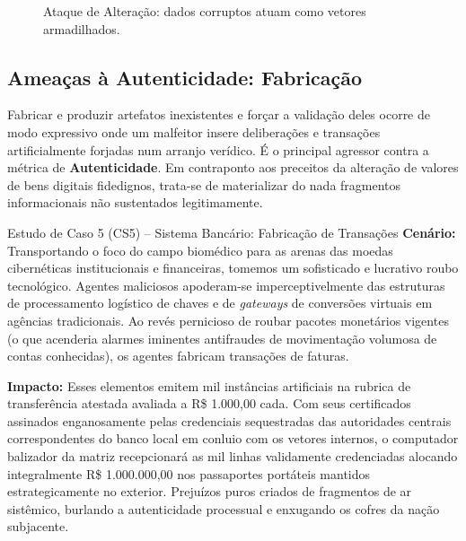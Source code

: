 \documentclass[12pt,a4paper,twoside]{report}
\begin{document}
\begin{figure}[h]
    \centering
    \caption{Ataque de Alteração: dados corruptos atuam como vetores armadilhados.}
    \label{fig:alteracao_registros}
\end{figure}

\subsection{Ameaças à Autenticidade: Fabricação}
Fabricar e produzir artefatos inexistentes e forçar a validação deles ocorre de modo expressivo onde um malfeitor insere deliberações e transações artificialmente forjadas num arranjo verídico. É o principal agressor contra a métrica de \textbf{Autenticidade}. Em contraponto aos preceitos da alteração de valores de bens digitais fidedignos, trata-se de materializar do nada fragmentos informacionais não sustentados legitimamente. 

\begin{block}{Estudo de Caso 5 (CS5) – Sistema Bancário: Fabricação de Transações}
\textbf{Cenário:} Transportando o foco do campo biomédico para as arenas das moedas cibernéticas institucionais e financeiras, tomemos um sofisticado e lucrativo roubo tecnológico. Agentes maliciosos apoderam-se imperceptivelmente das estruturas de processamento logístico de chaves e de \textit{gateways} de conversões virtuais em agências tradicionais. Ao revés pernicioso de roubar pacotes monetários vigentes (o que acenderia alarmes iminentes antifraudes de movimentação volumosa de contas conhecidas), os agentes fabricam transações de faturas.

\textbf{Impacto:} Esses elementos emitem mil instâncias artificiais na rubrica de transferência atestada avaliada a R\$ 1.000,00 cada. Com seus certificados assinados enganosamente pelas credenciais sequestradas das autoridades centrais correspondentes do banco local em conluio com os vetores internos, o computador balizador da matriz recepcionará as mil linhas validamente credenciadas alocando integralmente  R\$ 1.000.000,00 nos passaportes portáteis mantidos estrategicamente no exterior. Prejuízos puros criados de fragmentos de ar sistêmico, burlando a autenticidade processual e enxugando os cofres da nação subjacente.
\end{block}
\end{document}
